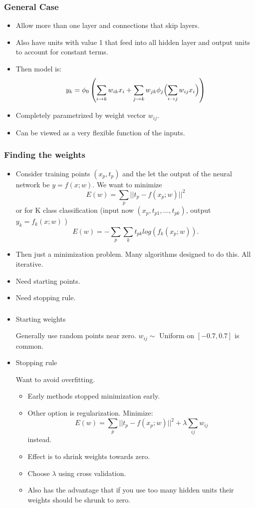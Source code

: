 \documentclass{beamer}
\begin{document}
\begin{frame}
	\frametitle{General Case}
	\begin{itemize}
		\item Allow more than one layer and connections that skip layers.
		\item 	Also have units with value 1 that feed into all hidden layer and output units to account for constant terms.

		\item 	Then model is:
		\[
		 	y_k = \phi_0\left( \sum_{i \to k }{w_{ik}x_i} + \sum_{j \to k}w_{jk}{\phi_j \Bigl(\sum_{i \to j} w_{ij}x_i \Bigr)} \right)
\]	
		\item Completely parametrized by weight vector $w_{ij}$.
		\item Can be viewed as a very flexible function of the inputs.
	\end{itemize}
\end{frame}

\begin{frame}
	\frametitle{Finding the weights}
	\begin{itemize}
		\item Consider training points $(x_p, t_p)$ and the let the  output of the neural network be $y = f(x; w)$. We want to minimize
		\[
		E(w) =  \sum_p ||t_p - f(x_p; w)||^2
		\]
		or for K class classification (input now $(x_p, t_{p1}, \dots, t_{pk})$, output $y_k = f_k(x; w)$ )
		\[
		E(w) = - \sum_p \sum_k t_{pk} log(f_k(x_p; w)).
		\]
		
		\item Then just a minimization problem.  Many algorithms designed to do this. All iterative.
		\item Need starting points.
		\item Need stopping rule.
	\end{itemize}	
\end{frame}

\begin{frame}
	\frametitle{}
	\begin{itemize}
		\item Starting weights
		
			Generally use random points near zero.  $w_{ij} \sim$ Uniform on $[-0.7,0.7]$ is common.
		\item Stopping rule
		
		Want to avoid overfitting.  
		\begin{itemize}
			\item Early methods stopped minimization early.
			\item Other option is regularization.  Minimize:
			\[
			E(w) =  \sum_p ||t_p - f(x_p; w)||^2 + \lambda \sum_{ij} w_{ij}
			\]
			instead.
			\item Effect is to shrink weights towards zero.
			\item Choose $\lambda$ using cross validation.
			\item 	Also has the advantage that if you use too many hidden units their weights should be shrunk to zero.
		\end{itemize}
	\end{itemize}
\end{frame}
\end{document}

